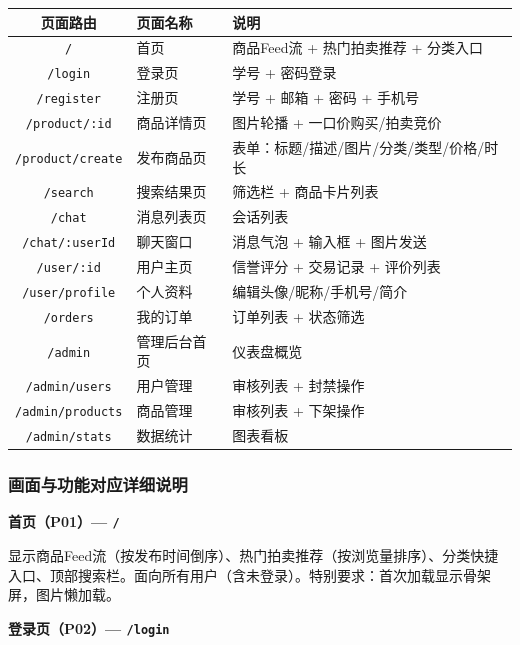 \documentclass[12pt,a4paper]{ctexart}
\numberwithin{figure}{section}
\numberwithin{table}{section}
\begin{document}
\begin{center}
\renewcommand{\arraystretch}{1.3}
\small
\begin{tabular}{|c|p{4cm}|p{6cm}|}
\hline
\rowcolor{tableheader}
\textbf{页面路由} & \textbf{页面名称} & \textbf{说明} \\
\hline
\verb|/| & 首页 & 商品Feed流 + 热门拍卖推荐 + 分类入口 \\
\hline
\verb|/login| & 登录页 & 学号 + 密码登录 \\
\hline
\verb|/register| & 注册页 & 学号 + 邮箱 + 密码 + 手机号 \\
\hline
\verb|/product/:id| & 商品详情页 & 图片轮播 + 一口价购买/拍卖竞价 \\
\hline
\verb|/product/create| & 发布商品页 & 表单：标题/描述/图片/分类/类型/价格/时长 \\
\hline
\verb|/search| & 搜索结果页 & 筛选栏 + 商品卡片列表 \\
\hline
\verb|/chat| & 消息列表页 & 会话列表 \\
\hline
\verb|/chat/:userId| & 聊天窗口 & 消息气泡 + 输入框 + 图片发送 \\
\hline
\verb|/user/:id| & 用户主页 & 信誉评分 + 交易记录 + 评价列表 \\
\hline
\verb|/user/profile| & 个人资料 & 编辑头像/昵称/手机号/简介 \\
\hline
\verb|/orders| & 我的订单 & 订单列表 + 状态筛选 \\
\hline
\verb|/admin| & 管理后台首页 & 仪表盘概览 \\
\hline
\verb|/admin/users| & 用户管理 & 审核列表 + 封禁操作 \\
\hline
\verb|/admin/products| & 商品管理 & 审核列表 + 下架操作 \\
\hline
\verb|/admin/stats| & 数据统计 & 图表看板 \\
\hline
\end{tabular}
\end{center}

\subsubsection{画面与功能对应详细说明}

\textbf{首页（P01）--- \texttt{/}}

显示商品Feed流（按发布时间倒序）、热门拍卖推荐（按浏览量排序）、分类快捷入口、顶部搜索栏。面向所有用户（含未登录）。特别要求：首次加载显示骨架屏，图片懒加载。

\textbf{登录页（P02）--- \texttt{/login}}
\end{document}
